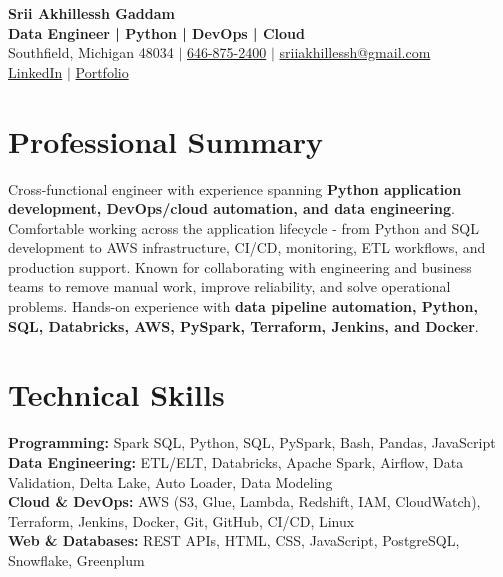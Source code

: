 \documentclass[letterpaper,10pt]{article}
\begin{document}
\fontsize{9.35pt}{10.45pt}\selectfont

\begin{center}
    {\LARGE \textbf{Srii Akhillessh Gaddam}} \\[-1pt]
    \textbf{Data Engineer | Python | DevOps | Cloud} \\[2pt]
    Southfield, Michigan 48034 $|$
    \href{tel:6468752400}{646-875-2400} $|$
    \href{mailto:sriiakhillessh@gmail.com}{sriiakhillessh@gmail.com} \\[1pt]
    \href{https://www.linkedin.com/in/srii-akhiilessh-gaddam-b48668191/}{LinkedIn} $|$
    \href{https://sriiakhillesshg.github.io/portfolio/}{Portfolio}
\end{center}
\vspace{-8pt}

\section{Professional Summary}
\small{Cross-functional engineer with experience spanning \textbf{Python application development, DevOps/cloud automation, and data engineering}. Comfortable working across the application lifecycle - from Python and SQL development to AWS infrastructure, CI/CD, monitoring, ETL workflows, and production support. Known for collaborating with engineering and business teams to remove manual work, improve reliability, and solve operational problems. Hands-on experience with \textbf{data pipeline automation, Python, SQL, Databricks, AWS, PySpark, Terraform, Jenkins, and Docker}.}

\section{Technical Skills}
\small{
\textbf{Programming:} Spark SQL, Python, SQL, PySpark, Bash, Pandas, JavaScript \\
\textbf{Data Engineering:} ETL/ELT, Databricks, Apache Spark, Airflow, Data Validation, Delta Lake, Auto Loader, Data Modeling \\
\textbf{Cloud \& DevOps:} AWS (S3, Glue, Lambda, Redshift, IAM, CloudWatch), Terraform, Jenkins, Docker, Git, GitHub, CI/CD, Linux \\
\textbf{Web \& Databases:} REST APIs, HTML, CSS, JavaScript, PostgreSQL, Snowflake, Greenplum
}

\end{document}
